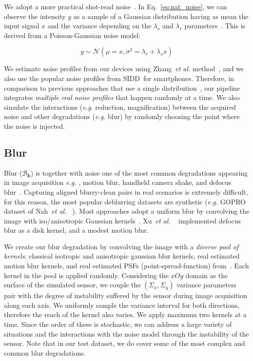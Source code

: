 \documentclass{article}
\newcommand{\eg}{\emph{e.g.} }
\newcommand{\etal}{\emph{et al.} }
\begin{document}
We adopt a more practical shot-read noise~\cite{hasinoff2014photon, brooks2019unprocessing, zhang2021rethinking}. In Eq.~\ref{eq:nat_noise}, we can observe the intensity $y$ as a sample of a Gaussian distribution having as mean the input signal $x$ and the variance depending on the $\lambda_{s}$ and $\lambda_{r}$ parameters~\cite{brooks2019unprocessing}. This is derived from a Poisson-Gaussian noise model:

\begin{equation}
y \sim \mathcal{N}(\mu=x, \sigma^2=\lambda_{r} + \lambda_{s}x)
\label{eq:nat_noise}
\end{equation}

We estimate noise profiles from our devices using Zhang~\etal method~\cite{zhang2021rethinking}, and we also use the popular noise profiles from SIDD~\cite{abdelhamed2018high, Abdelhamed_2019_CVPR_Workshops}for smartphones. Therefore, in comparison to previous approaches that use a single distribution~\cite{xu2019rawsr, brooks2019unprocessing}, our pipeline integrates \emph{multiple real noise profiles} that happen randomly at a time. We also simulate the interactions (\eg reduction, magnification) between the acquired noise and other degradations (\eg blur) by randomly choosing the point where the noise is injected.

\subsection{Blur}\label{section:blur}

Blur ($\mathcal{B}_\mathbf{k}$) is together with noise one of the most common degradations appearing in image acquisition \eg, motion blur, handheld camera shake, and defocus blur~\cite{hosseini2019convolutionalblur}. Capturing aligned blurry-clean pairs in real scenarios is extremely difficult, for this reason, the most popular deblurring datasets are synthetic (\eg GOPRO dataset of Nah~\etal~\cite{nah2017Gopro}).
%
Most approaches adopt a uniform blur by convolving the image with iso/anisotropic Gaussian kernels~\cite{kai2021bsrgan}. Xu~\etal~\cite{xu2019rawsr, xu2020exploiting} implemented defocus blur as a disk kernel, and a modest motion blur.

We create our blur degradation by convolving the image with a \emph{diverse pool of kernels}: classical isotropic and anisotropic gaussian blur kernels, real estimated motion blur kernels, and real estimated PSFs (point-spread-function) from~\cite{kai2021bsrgan}.
%
Each kernel in the pool is applied randomly. Considering the $xOy$ domain as the surface of the simulated sensor, we couple the $(\Sigma_x, \Sigma_y)$ variance parameters pair with the degree of instability suffered by the sensor during image acquisition along each axis. We uniformly sample the variance interval for both directions, therefore the reach of the kernel also varies. We apply maximum two kernels at a time. Since the order of these is stochastic, we can address a large variety of situations and the interactions with the noise model through the instability of the sensor. Note that in our test dataset, we do cover some of the most complex and common blur degradations.
\end{document}
